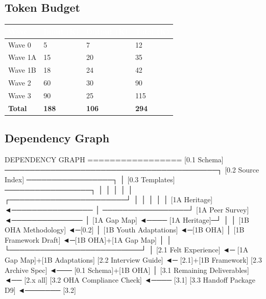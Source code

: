 \documentclass[11pt,letterpaper]{article}
\newcommand{\tableheader}[1]{\textbf{\sffamily\textcolor{white}{#1}}}
\begin{document}
\subsection{Token Budget}

\begin{center}
\begin{tabularx}{\textwidth}{L{4cm}C{2cm}C{2cm}C{2cm}}
\toprule
{}
\tableheader{Wave} & \tableheader{Input (K)} & \tableheader{Output (K)} & \tableheader{Total (K)} \\
\midrule
Wave 0 & 5 & 7 & 12 \\
Wave 1A & 15 & 20 & 35 \\
Wave 1B & 18 & 24 & 42 \\
Wave 2 & 60 & 30 & 90 \\
Wave 3 & 90 & 25 & 115 \\
\midrule
{}
\textbf{Total} & \textbf{188} & \textbf{106} & \textbf{294} \\
\bottomrule
\end{tabularx}
\end{center}

\subsection{Dependency Graph}

\begin{asciibox}
DEPENDENCY GRAPH
=================
[0.1 Schema] ──────────────────────────────────────────┐
[0.2 Source Index] ─────────────────┐                  │
[0.3 Templates] ─────────────────┐  │                  │
                                 │  │                  │
         ┌───────────────────────┘  │                  │
         │                          │                  │
    [1A Heritage] ◄──────────────── │ ─────────────────┘
    [1A Peer Survey] ◄────────────── │
    [1A Gap Map] ◄──── [1A Heritage]─┘
         │
         │              [1B OHA Methodology] ◄─[0.2]
         │              [1B Youth Adaptations] ◄─[1B OHA]
         │              [1B Framework Draft] ◄─[1B OHA]+[1A Gap Map]
         │                          │
         └──────────────────────────┘
                        │
               [2.1 Felt Experience] ◄─ [1A Gap Map]+[1B Adaptations]
               [2.2 Interview Guide] ◄─ [2.1]+[1B Framework]
               [2.3 Archive Spec] ◄─── [0.1 Schema]+[1B OHA]
                        │
          [3.1 Remaining Deliverables] ◄── [2.x all]
          [3.2 OHA Compliance Check] ◄──── [3.1]
          [3.3 Handoff Package D9] ◄─────── [3.2]
\end{asciibox}
\end{document}
